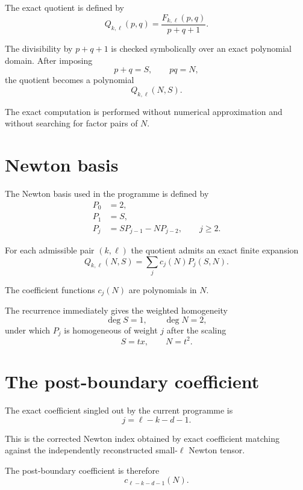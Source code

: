 \documentclass[11pt,a4paper]{article}
\begin{document}
The exact quotient is defined by
\begin{equation}
Q_{k,\ell}(p,q)
=
\frac{F_{k,\ell}(p,q)}{p+q+1}.
\end{equation}

The divisibility by $p+q+1$ is checked symbolically over an exact polynomial domain. After imposing
\[
p+q=S,\qquad pq=N,
\]
the quotient becomes a polynomial
\[
Q_{k,\ell}(N,S).
\]

The exact computation is performed without numerical approximation and without searching for factor pairs of $N$.

\section{Newton basis}

The Newton basis used in the programme is defined by
\begin{align}
P_0&=2,\\
P_1&=S,\\
P_j&=SP_{j-1}-NP_{j-2},\qquad j\ge 2.
\end{align}

For each admissible pair $(k,\ell)$ the quotient admits an exact finite expansion
\begin{equation}
Q_{k,\ell}(N,S)
=
\sum_j c_j(N)P_j(S,N).
\end{equation}

The coefficient functions $c_j(N)$ are polynomials in $N$.

The recurrence immediately gives the weighted homogeneity
\[
\deg S=1,\qquad \deg N=2,
\]
under which $P_j$ is homogeneous of weight $j$ after the scaling
\[
S=tx,\qquad N=t^2.
\]

\section{The post-boundary coefficient}

The exact coefficient singled out by the current programme is
\begin{equation}
\boxed{
 j=\ell-k-d-1.
}
\end{equation}

This is the corrected Newton index obtained by exact coefficient matching against the independently reconstructed small-$\ell$ Newton tensor.

The post-boundary coefficient is therefore
\begin{equation}
 c_{\ell-k-d-1}(N).
\end{equation}
\end{document}
